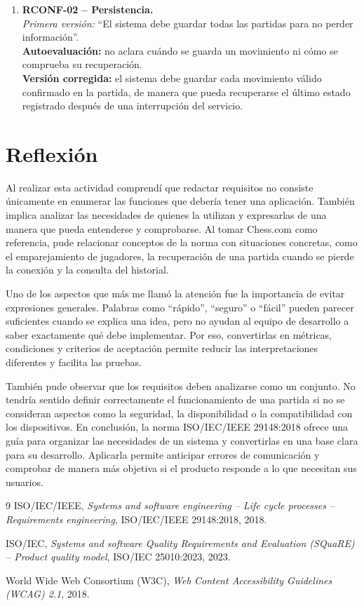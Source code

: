 \documentclass[12pt,a4paper]{article}
\begin{document}
\begin{enumerate}[leftmargin=*]
    \item \textbf{RCONF-02 -- Persistencia.}\\
    \textit{Primera versión:} ``El sistema debe guardar todas las partidas para no perder información''.\\
    \textbf{Autoevaluación:} no aclara cuándo se guarda un movimiento ni cómo se comprueba su recuperación.\\
    \textbf{Versión corregida:} el sistema debe guardar cada movimiento válido confirmado en la partida, de manera que pueda recuperarse el último estado registrado después de una interrupción del servicio.
\end{enumerate}

\newpage
\section{Reflexión}

Al realizar esta actividad comprendí que redactar requisitos no consiste únicamente en enumerar las funciones que debería tener una aplicación. También implica analizar las necesidades de quienes la utilizan y expresarlas de una manera que pueda entenderse y comprobarse. Al tomar Chess.com como referencia, pude relacionar conceptos de la norma con situaciones concretas, como el emparejamiento de jugadores, la recuperación de una partida cuando se pierde la conexión y la consulta del historial.

Uno de los aspectos que más me llamó la atención fue la importancia de evitar expresiones generales. Palabras como ``rápido'', ``seguro'' o ``fácil'' pueden parecer suficientes cuando se explica una idea, pero no ayudan al equipo de desarrollo a saber exactamente qué debe implementar. Por eso, convertirlas en métricas, condiciones y criterios de aceptación permite reducir las interpretaciones diferentes y facilita las pruebas.

También pude observar que los requisitos deben analizarse como un conjunto. No tendría sentido definir correctamente el funcionamiento de una partida si no se consideran aspectos como la seguridad, la disponibilidad o la compatibilidad con los dispositivos. En conclusión, la norma ISO/IEC/IEEE 29148:2018 ofrece una guía para organizar las necesidades de un sistema y convertirlas en una base clara para su desarrollo. Aplicarla permite anticipar errores de comunicación y comprobar de manera más objetiva si el producto responde a lo que necesitan sus usuarios.

\begin{thebibliography}{9}
    ISO/IEC/IEEE, \emph{Systems and software engineering -- Life cycle processes -- Requirements engineering}, ISO/IEC/IEEE 29148:2018, 2018.

    ISO/IEC, \emph{Systems and software Quality Requirements and Evaluation (SQuaRE) -- Product quality model}, ISO/IEC 25010:2023, 2023.

    World Wide Web Consortium (W3C), \emph{Web Content Accessibility Guidelines (WCAG) 2.1}, 2018.
\end{thebibliography}
\end{document}
